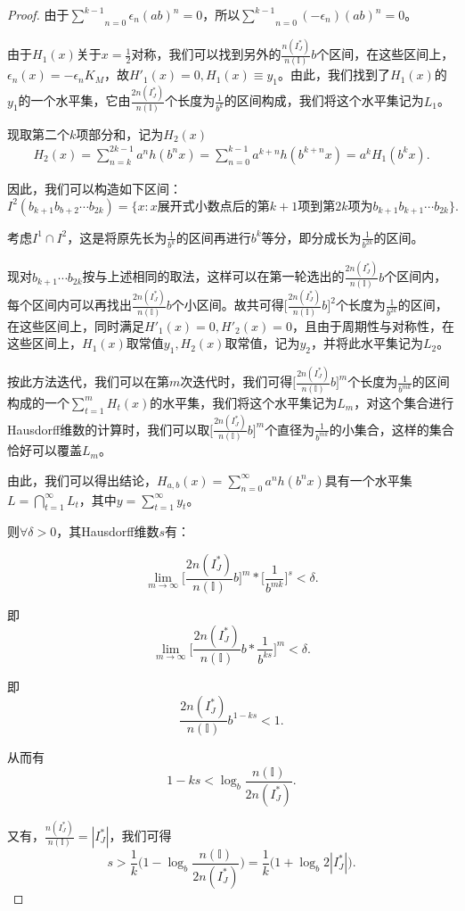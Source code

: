 \begin{proof}
由于$\underset{n=0}{\overset{k-1}{\sum}}\epsilon_n(ab)^n=0$，所以$\underset{n=0}{\overset{k-1}{\sum}}(-\epsilon_n)(ab)^n=0$。

由于$H_1(x)$关于$x=\frac{1}{2}$对称，我们可以找到另外的$\frac{n(I_J^*)}{n(\mathbb{I})}b$个区间，在这些区间上，$\epsilon_n(x)=-\epsilon_nK_M$，故$H'_1(x)=0,H_1(x)\equiv y_1$。由此，我们找到了$H_1(x)$的$y_1$的一个水平集，它由$\frac{2n(I_J^*)}{n(\mathbb{I})}$个长度为$\frac{1}{b^k}$的区间构成，我们将这个水平集记为$L_1$。

现取第二个$k$项部分和，记为$H_2(x)$
$$
      \begin{aligned}
            H_2(x)= \sum_{n=k}^{2k-1}a^nh(b^nx)= \sum_{n=0}^{k-1}a^{k+n}h(b^{k+n}x)= a^kH_1(b^kx).
      \end{aligned}
$$

因此，我们可以构造如下区间：
$$
      I^2(b_{k+1}b_{b+2}\cdots b_{2k})=\{x:x\mbox{展开式小数点后的第}k+1\mbox{项到第}2k\mbox{项为}b_{k+1}b_{k+1}\cdots b_{2k}\}.
$$

考虑$I^1\cap I^2$，这是将原先长为$\frac{1}{b^k}$的区间再进行$b^k$等分，即分成长为$\frac{1}{b^{2k}}$的区间。

现对$b_{k+1}\cdots b_{2k}$按与上述相同的取法，这样可以在第一轮选出的$\frac{2n(I_J^*)}{n(\mathbb{I})}b$个区间内，每个区间内可以再找出$\frac{2n(I_J^*)}{n(\mathbb{I})}b$个小区间。故共可得$\big[\frac{2n(I_J^*)}{n(\mathbb{I})}b\big]^2$个长度为$\frac{1}{b^{2k}}$的区间，在这些区间上，同时满足$H'_1(x)=0,H'_2(x)=0$，且由于周期性与对称性，在这些区间上，$H_1(x)$取常值$y_1,H_2(x)$取常值，记为$y_2$，并将此水平集记为$L_2$。

按此方法迭代，我们可以在第$m$次迭代时，我们可得$\big[\frac{2n(I_J^*)}{n(\mathbb{I})}b\big]^m$个长度为$\frac{1}{b^{mk}}$的区间构成的一个$\sum_{t=1}^mH_t(x)$的水平集，我们将这个水平集记为$L_m$，对这个集合进行Hausdorff维数的计算时，我们可以取$\big[\frac{2n(I_J^*)}{n(\mathbb{I})}b\big]^m$个直径为$\frac{1}{b^{mk}}$的小集合，这样的集合恰好可以覆盖$L_m$。

由此，我们可以得出结论，$H_{a,b}(x)=\sum_{n=0}^\infty a^nh(b^nx)$具有一个水平集$L=\bigcap_{t=1}^\infty L_t$，其中$y=\sum_{t=1}^\infty y_t$。

则$\forall \delta>0$，其Hausdorff维数$s$有：

$$
      \lim_{m\rightarrow\infty}\Big[\frac{2n(I_J^*)}{n(\mathbb{I})}b\Big]^m*\Big[\frac{1}{b^{mk}}\Big]^s<\delta.
$$

即
$$
      \lim_{m\rightarrow\infty}\Big[\frac{2n(I_J^*)}{n(\mathbb{I})}b*\frac{1}{b^{ks}}\Big]^m<\delta.
$$

即
$$
      \frac{2n(I_J^*)}{n(\mathbb{I})}b^{1-ks}<1.
$$

从而有
$$
      1-ks<\log_b\frac{n(\mathbb{I})}{2n(I_J^*)}.
$$

又有，$\frac{n(I_J^*)}{n(\mathbb{I})}=|I_J^*|$，我们可得
$$
      s>\frac{1}{k}\Big(1-\log_b\frac{n(\mathbb{I})}{2n(I_J^*)}\Big)=\frac{1}{k}\Big(1+\log_b2|I_J^*|\Big).
$$

\end{proof}

